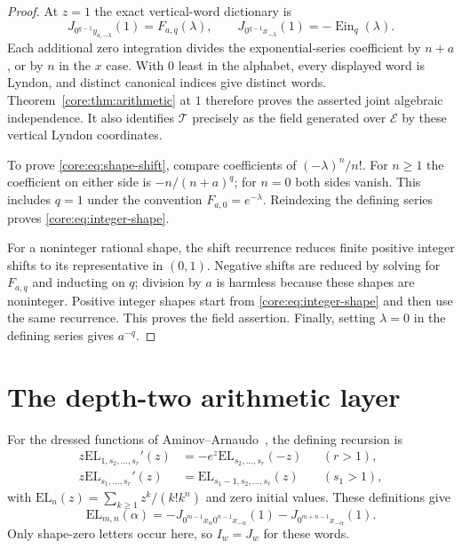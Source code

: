 \documentclass[11pt,a4paper]{article}
\newcommand{\E}{\mathcal E}
\newcommand{\T}{\mathcal T}
\newcommand{\EL}{\mathrm{EL}}
\DeclareMathOperator{\Ein}{Ein}
\theoremstyle{definition}
\theoremstyle{remark}
\numberwithin{equation}{section}
\begin{document}
\begin{proof}
At $z=1$ the exact vertical-word dictionary is
\begin{equation}
 J_{0^{q-1}y_{a,-\lambda}}(1)=F_{a,q}(\lambda),\qquad
 J_{0^{q-1}x_{-\lambda}}(1)=-\Ein_q(\lambda).
 \label{core:eq:vertical}
\end{equation}
Each additional zero integration divides the exponential-series
coefficient by $n+a$, or by $n$ in the $x$ case. With $0$ least in
the alphabet, every displayed word is Lyndon, and distinct canonical
indices give distinct words. Theorem~\ref{core:thm:arithmetic} at $1$
therefore proves the asserted joint algebraic independence. It also
identifies $\T$ precisely as the field generated over $\E$ by these
vertical Lyndon coordinates.

To prove \eqref{core:eq:shape-shift}, compare coefficients of
$(-\lambda)^n/n!$. For $n\ge1$ the coefficient on either side is
$-n/(n+a)^q$; for $n=0$ both sides vanish. This includes $q=1$
under the convention $F_{a,0}=e^{-\lambda}$. Reindexing the defining
series proves \eqref{core:eq:integer-shape}.

For a noninteger rational shape, the shift recurrence reduces finite
positive integer shifts to its representative in $(0,1)$. Negative
shifts are reduced by solving for $F_{a,q}$ and inducting on $q$;
division by $a$ is harmless because these shapes are noninteger.
Positive integer shapes start from \eqref{core:eq:integer-shape}
and then use the same recurrence. This proves the field assertion.
Finally, setting $\lambda=0$ in the defining series gives $a^{-q}$.
\end{proof}

\section{The depth-two arithmetic layer}
For the dressed functions of Aminov--Arnaudo~\cite{AA}, the defining recursion is
\begin{align*}
 z\EL_{1,s_2,\ldots,s_r}'(z)
       &=-e^z\EL_{s_2,\ldots,s_r}(-z) &&(r>1),\\
 z\EL_{s_1,\ldots,s_r}'(z)&=\EL_{s_1-1,s_2,\ldots,s_r}(z)
       &&(s_1>1),
\end{align*}
with $\EL_n(z)=\sum_{k\ge1}z^k/(k!k^n)$ and zero initial values.
These definitions give
\begin{equation}
 \EL_{m,n}(\alpha)
 =-J_{0^{m-1}x_\alpha0^{n-1}x_{-\alpha}}(1)
  -J_{0^{m+n-1}x_{-\alpha}}(1).
 \label{core:eq:depthdictionary}
\end{equation}
Only shape-zero letters occur here, so $I_w=J_w$ for these words.
\end{document}
